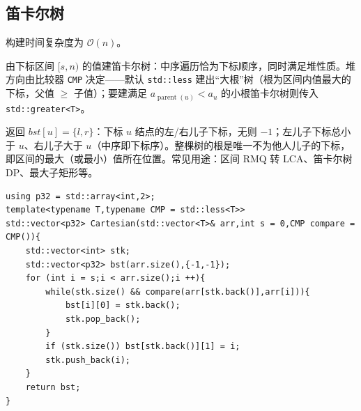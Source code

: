 \subsection{笛卡尔树}

构建时间复杂度为 $\mathcal{O}(n)$。

由下标区间 $[s,n)$ 的值建笛卡尔树：中序遍历恰为下标顺序，同时满足堆性质。堆方向由比较器 \texttt{CMP} 决定——默认 \texttt{std::less} 建出“大根”树（根为区间内值最大的下标，父值 $\ge$ 子值）；要建满足 $a_{\operatorname{parent}(u)}<a_u$ 的小根笛卡尔树则传入 \texttt{std::greater<T>}。

返回 $bst[u]=\{l,r\}$：下标 $u$ 结点的左/右儿子下标，无则 $-1$；左儿子下标总小于 $u$、右儿子大于 $u$（中序即下标序）。整棵树的根是唯一不为他人儿子的下标，即区间的最大（或最小）值所在位置。常见用途：区间 RMQ 转 LCA、笛卡尔树 DP、最大子矩形等。

\begin{lstlisting}
using p32 = std::array<int,2>;
template<typename T,typename CMP = std::less<T>>
std::vector<p32> Cartesian(std::vector<T>& arr,int s = 0,CMP compare = CMP()){
    std::vector<int> stk;
    std::vector<p32> bst(arr.size(),{-1,-1});
    for (int i = s;i < arr.size();i ++){
        while(stk.size() && compare(arr[stk.back()],arr[i])){
            bst[i][0] = stk.back();
            stk.pop_back();
        }
        if (stk.size()) bst[stk.back()][1] = i;
        stk.push_back(i);
    }
    return bst;
}
\end{lstlisting}